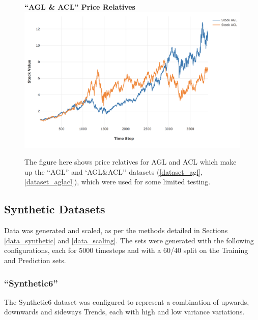 \documentclass[a4paper,11pt,oneside]{article}
\theoremstyle{plain}
\theoremstyle{definition}
\begin{document}
	\begin{figure}[H]
		\centering
		\textbf{``AGL \& ACL'' Price Relatives}
		\includegraphics[scale=0.45]{images/results/prices/aglacl_prices.png} 
		\caption[`AGL\&ACL'' Price Relatives]{The figure here shows price relatives for AGL and ACL which make up the ``AGL'' and `AGL\&ACL'' datasets (\ref{dataset_agl}, \ref{dataset_aglacl}), which were used for some limited testing.}
		\label{figure-aglacl_prices}
	\end{figure}
	

	
	
	\subsection{Synthetic Datasets}
	
	Data was generated and scaled, as per the methods detailed in Sections \ref{data_synthetic} and \ref{data_scaling}. The sets were generated with the following configurations, each for 5000 timesteps and with a 60/40 split on the Training and Prediction sets.
	
	\subsubsection{``Synthetic6''} \label{dataset_synthetic6}
	
	The Synthetic6 dataset was configured to represent a combination of upwards, downwards and sideways Trends, each with high and low variance variations.
	
\end{document}
